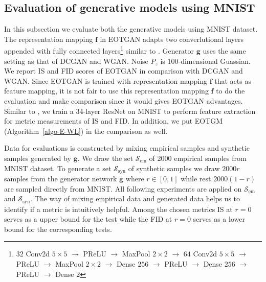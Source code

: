 \subsection{Evaluation of generative models using MNIST}
In this subsection we evaluate both the generative models using MNIST dataset.
The representation mapping $\bm{f}$ in EOTGAN adapts two converlutional layers
appended with fully connected layers\footnote{$32$ Conv2d $5 \times5$
  $\rightarrow$ PReLU $\rightarrow$ MaxPool $2\times2$ $\rightarrow$
  $64$ Conv2d $5\times5$ $\rightarrow$ PReLU $\rightarrow$ MaxPool
  $2\times2$ $\rightarrow$ Dense $256$ $\rightarrow$ PReLU
  $\rightarrow$ Dense $256$ $\rightarrow$ PReLU $\rightarrow$ Dense
  $2$}
similar to \cite{1467314}\cite{1640964}. Generator $\bm{g}$ uses the same
setting as that of DCGAN and WGAN. Noise $P_z$ is $100$-dimensional Guassian.
We report IS and FID scores of EOTGAN in comparison with DCGAN and WGAN. Since EOTGAN is trained with representation mapping $\bm{f}$ that
acts as feature mapping, it is not fair to use this representation mapping $\bm{f}$ to do the
evaluation and make comparison since it would gives EOTGAN
advantages. Similar to \cite{2018arXiv180607755X}, we train a 34-layer
ResNet on MNIST to perform feature extraction for metric measurements
of IS and FID. In addition, we put EOTGM (Algorithm~\autoref{algo-E-WL}) in the comparison as well.

Data for evaluations is constructed by mixing empirical samples and
synthetic samples generated by $\bm{g}$. We draw the set $\mathcal{S}_{\mathrm{em}}$ of 2000 empirical samples from MNIST dataset. To generate a set $\mathcal{S}_{\mathrm{syn}}$ of synthetic
samples we draw $2000r$ samples from the generator network $\bm{g}$ where
$r\in[0,1]$ while rest $2000(1-r)$ are sampled directly from
MNIST. All following experiments are applied on
$\mathcal{S}_{\mathrm{em}}$ and $\mathcal{S}_{\mathrm{syn}}$. 
The way of mixing empirical data and generated data helps
us to identify if a metric is intuitively helpful. Among the chosen metrics IS at $r=0$ serves as a upper bound for the test while the FID at $r=0$ serves as a lower bound for the corresponding tests. %

